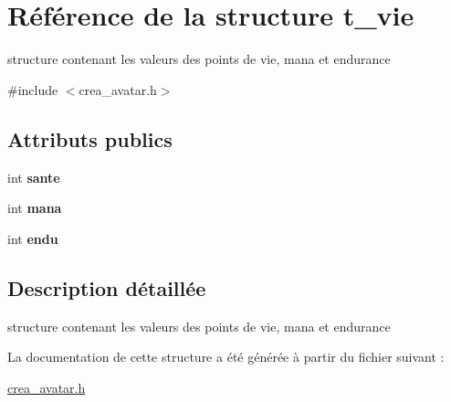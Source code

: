 \hypertarget{structt__vie}{\section{Référence de la structure t\-\_\-vie}
\label{structt__vie}
}


structure contenant les valeurs des points de vie, mana et endurance  




{\ttfamily \#include $<$crea\-\_\-avatar.\-h$>$}

\subsection*{Attributs publics}
\begin{DoxyCompactItemize}
\item 
\hypertarget{structt__vie_ac373276d06e4a73eaa6894dfee3e1261}{int {\bfseries sante}}\label{structt__vie_ac373276d06e4a73eaa6894dfee3e1261}

\item 
\hypertarget{structt__vie_a2aeab85d078ae28f9bed73b62e2fcc1e}{int {\bfseries mana}}\label{structt__vie_a2aeab85d078ae28f9bed73b62e2fcc1e}

\item 
\hypertarget{structt__vie_a617d7e58e4540a5e379b384138e875c4}{int {\bfseries endu}}\label{structt__vie_a617d7e58e4540a5e379b384138e875c4}

\end{DoxyCompactItemize}


\subsection{Description détaillée}
structure contenant les valeurs des points de vie, mana et endurance 

La documentation de cette structure a été générée à partir du fichier suivant \-:\begin{DoxyCompactItemize}
\item 
\hyperlink{crea__avatar_8h}{crea\-\_\-avatar.\-h}\end{DoxyCompactItemize}
